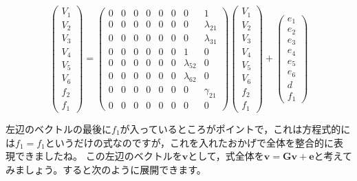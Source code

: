 \documentclass{ltjsbook}
\begin{document}
\[
    \begin{pmatrix} V_1 \\ V_2 \\ V_3 \\ V_4 \\ V_5 \\ V_6 \\ f_2 \\f_1 \end{pmatrix} =
    \begin{pmatrix} 0 & 0 & 0 & 0 & 0 & 0 & 0 & 1 \\
                                0 & 0 & 0 & 0 & 0 & 0 & 0 & \lambda_{21}  \\
                                0 & 0 & 0 & 0 & 0 & 0 & 0 & \lambda_{31}  \\
                                0 & 0 & 0 & 0 & 0 & 0 & 1 & 0 \\
                                0 & 0 & 0 & 0 & 0 & 0 & \lambda_{52} & 0\\
                                0 & 0 & 0 & 0 & 0 & 0 & \lambda_{62} & 0\\
                                0 & 0 & 0 & 0 & 0 & 0 & 0 &  \gamma_{21}\\
                                0 & 0 & 0 & 0 & 0 & 0 & 0 &  0 \end{pmatrix}
    \begin{pmatrix} V_1 \\ V_2 \\ V_3 \\ V_4 \\ V_5 \\ V_6 \\ f_2 \\f_1 \end{pmatrix} +
    \begin{pmatrix} e_1 \\ e_2 \\ e_3 \\ e_4 \\ e_5 \\ e_6 \\ d \\f_1 \end{pmatrix}
\]

左辺のベクトルの最後に$f_1$が入っているところがポイントで，これは方程式的には$f_1=f_1$というだけの式なのですが，これを入れたおかげで全体を整合的に表現できましたね。
この左辺のベクトルを$\bm{v}$として，式全体を$\bm{v} = \bm{Gv}+\bm{e}$と考えてみましょう。すると次のように展開できます。
\end{document}
